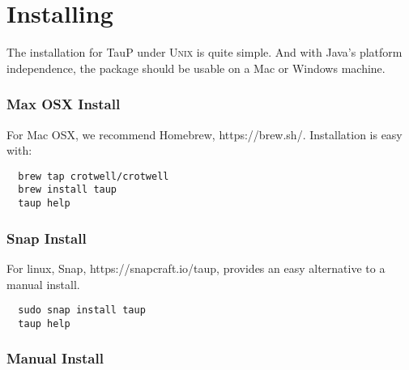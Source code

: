
\section{Installing}
\label{install}

The installation for TauP under \textsc{Unix} is quite simple. And with Java's
platform independence, the package should be usable on a Mac or Windows
machine.

\subsubsection{Max OSX Install}

For Mac OSX, we recommend Homebrew, https://brew.sh/. Installation is easy with:

\begin{verbatim}
  brew tap crotwell/crotwell
  brew install taup
  taup help
\end{verbatim}

\subsubsection{Snap Install}

For linux, Snap, https://snapcraft.io/taup, provides an easy alternative to a manual install.

\begin{verbatim}
  sudo snap install taup
  taup help
\end{verbatim}

\subsubsection{Manual Install}

